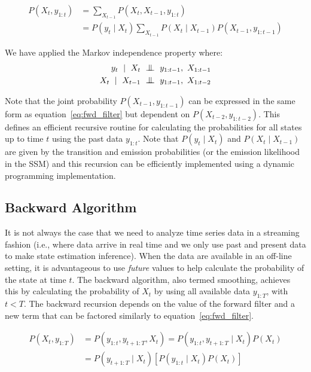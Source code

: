\begin{equation}\label{eq:fwd_filter}
  \begin{split}
    P(X_t, y_{1:t}) &= \sum_{X_{t-1}} P(X_t, X_{t-1}, y_{1:t}) \\&= P(y_{t} \mid X_t) \sum_{X_{t-1}} P(X_t \mid X_{t-1})P(X_{t-1}, y_{1:t-1})
  \end{split}
\end{equation}

We have applied the Markov independence property where: 
\begin{equation}
	\begin{split}
	y_{t}~\mid~X_t &~\indep~y_{1:t-1},~X_{1:t-1} \\
    X_{t}~\mid~X_{t-1} &~\indep~y_{1:t-1},~X_{1:t-2}
    \end{split}
\end{equation}

Note that the joint probability $P(X_{t-1}, y_{1:t-1})$ can be expressed in the same form as equation~\ref{eq:fwd_filter} but dependent on $P(X_{t-2}, y_{1:t-2})$. This defines an efficient recursive routine for calculating the probabilities for all states up to time $t$ using the past data $y_{1:t}$. Note that $P(y_{t} \mid X_t)$ and $P(X_t \mid X_{t-1})$ are given by the transition and emission probabilities (or the emission likelihood in the SSM) and this recursion can be efficiently implemented using a dynamic programming implementation.

\subsection{Backward Algorithm}
It is not always the case that we need to analyze time series data in a streaming fashion (i.e., where data arrive in real time and we only use past and present data to make state estimation inference). When the data are available in an off-line setting, it is advantageous to use \textit{future} values to help calculate the probability of the state at time $t$. The backward algorithm, also termed smoothing, achieves this by calculating the probability of $X_t$ by using all available data $y_{1:T}$, with $t < T$. The backward recursion depends on the value of the forward filter and a new term that can be factored similarly to equation~\ref{eq:fwd_filter}.

\begin{equation}\label{eq:bkwd_filter1}
  \begin{split}
    P(X_t, y_{1:T}) &= P(y_{1:t}, y_{t+1:T}, X_t) =  P(y_{1:t}, y_{t+1:T} \mid X_t)P(X_t)\\ &= P(y_{t+1:T} \mid X_t)[P(y_{1:t} \mid X_t)P(X_t)]
  \end{split}
\end{equation}

